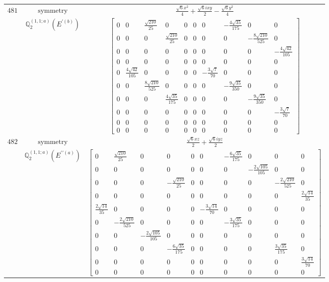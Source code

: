 \documentclass[fleqn,8pt,landscape]{jsarticle}
\begin{document}
\begin{longtable}{ccc}
$ 481 $ & $ \text{symmetry} $ & $ \frac{\sqrt{6} x^{2}}{4} + \frac{\sqrt{6} i x y}{2} - \frac{\sqrt{6} y^{2}}{4} $ \\
$  $ & $ \mathbb{Q}_{2}^{(1,1;a)}(E^{\prime(b)}) $ & $ \begin{bmatrix} 0 & 0 & \frac{\sqrt{210}}{25} & 0 & 0 & 0 & 0 & - \frac{4 \sqrt{35}}{175} & 0 & 0 \\ 0 & 0 & 0 & \frac{\sqrt{210}}{25} & 0 & 0 & 0 & 0 & - \frac{8 \sqrt{210}}{525} & 0 \\ 0 & 0 & 0 & 0 & 0 & 0 & 0 & 0 & 0 & - \frac{4 \sqrt{42}}{105} \\ 0 & 0 & 0 & 0 & 0 & 0 & 0 & 0 & 0 & 0 \\ 0 & \frac{4 \sqrt{42}}{105} & 0 & 0 & 0 & 0 & - \frac{3 \sqrt{7}}{70} & 0 & 0 & 0 \\ 0 & 0 & \frac{8 \sqrt{210}}{525} & 0 & 0 & 0 & 0 & - \frac{9 \sqrt{35}}{350} & 0 & 0 \\ 0 & 0 & 0 & \frac{4 \sqrt{35}}{175} & 0 & 0 & 0 & 0 & - \frac{9 \sqrt{35}}{350} & 0 \\ 0 & 0 & 0 & 0 & 0 & 0 & 0 & 0 & 0 & - \frac{3 \sqrt{7}}{70} \\ 0 & 0 & 0 & 0 & 0 & 0 & 0 & 0 & 0 & 0 \\ 0 & 0 & 0 & 0 & 0 & 0 & 0 & 0 & 0 & 0 \end{bmatrix} $ \\ \hline
$ 482 $ & $ \text{symmetry} $ & $ \frac{\sqrt{6} x z}{2} + \frac{\sqrt{6} i y z}{2} $ \\
$  $ & $ \mathbb{Q}_{2}^{(1,1;a)}(E^{\prime\prime(a)}) $ & $ \begin{bmatrix} 0 & \frac{\sqrt{210}}{25} & 0 & 0 & 0 & 0 & - \frac{6 \sqrt{35}}{175} & 0 & 0 & 0 \\ 0 & 0 & 0 & 0 & 0 & 0 & 0 & - \frac{2 \sqrt{105}}{105} & 0 & 0 \\ 0 & 0 & 0 & - \frac{\sqrt{210}}{25} & 0 & 0 & 0 & 0 & - \frac{2 \sqrt{210}}{525} & 0 \\ 0 & 0 & 0 & 0 & 0 & 0 & 0 & 0 & 0 & \frac{2 \sqrt{14}}{35} \\ \frac{2 \sqrt{14}}{35} & 0 & 0 & 0 & 0 & - \frac{3 \sqrt{14}}{70} & 0 & 0 & 0 & 0 \\ 0 & - \frac{2 \sqrt{210}}{525} & 0 & 0 & 0 & 0 & - \frac{3 \sqrt{35}}{175} & 0 & 0 & 0 \\ 0 & 0 & - \frac{2 \sqrt{105}}{105} & 0 & 0 & 0 & 0 & 0 & 0 & 0 \\ 0 & 0 & 0 & - \frac{6 \sqrt{35}}{175} & 0 & 0 & 0 & 0 & \frac{3 \sqrt{35}}{175} & 0 \\ 0 & 0 & 0 & 0 & 0 & 0 & 0 & 0 & 0 & \frac{3 \sqrt{14}}{70} \\ 0 & 0 & 0 & 0 & 0 & 0 & 0 & 0 & 0 & 0 \end{bmatrix} $ \\ \hline

\end{longtable}
\end{document}
